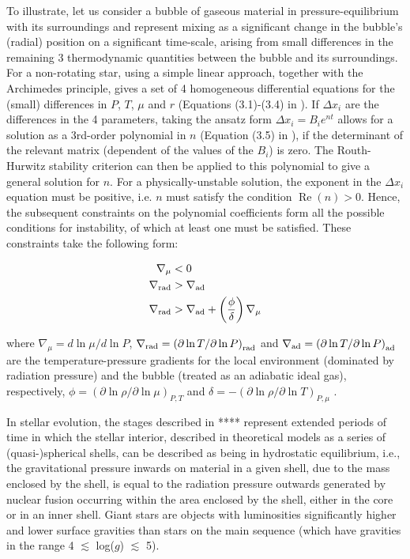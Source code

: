 \documentclass[12pt, a4paper]{report}
\begin{document}
To illustrate, let us consider a bubble of gaseous material in pressure-equilibrium with its surroundings and represent mixing as a significant change in the bubble's (radial) position on a significant time-scale, arising from small differences in the remaining 3 thermodynamic quantities between the bubble and its surroundings. For a non-rotating star, using a simple linear approach, together with the Archimedes principle, gives a set of 4 homogeneous differential equations for the (small) differences in $P$, $T$, $\mu$ and $r$ (Equations (3.1)-(3.4) in \cite{2017RSOS....470192S}). If $\Delta x_{i}$ are the differences in the 4 parameters, taking the ansatz form $\Delta x_{i} = B_{i} e^{nt}$ allows for a solution as a 3rd-order polynomial in $n$ (Equation (3.5) in \cite{2017RSOS....470192S}), if the determinant of the relevant matrix (dependent of the values of the $B_{i}$) is zero. The Routh-Hurwitz stability criterion can then be applied to this polynomial to give a general solution for $n$. For a physically-unstable solution, the exponent in the $\Delta x_{i}$ equation must be positive, i.e. $n$ must satisfy the condition $\operatorname{Re}(n) > 0$. Hence, the subsequent constraints on the polynomial coefficients form all the possible conditions for instability,  of which at least one must be satisfied. These constraints take the following form:

\begin{align}
\nabla _{\mu} &< 0 \label{mu_inv_ineq} \\
\nabla _{\textnormal{rad}} &> \nabla _{\textnormal{ad}} \label{schwarz_ineq} \\
\nabla _{\textnormal{rad}} &> \nabla _{\textnormal{ad}} + \left( \frac{\phi}{\delta} \right) \nabla _{\mu} \label{ledoux_ineq}
\end{align}

where $\nabla _{\mu} = d\ln\mu / d\ln P$, $\nabla _{\textnormal{rad}} = \left(\partial\ln T / \partial\ln P \right)_{\textnormal{rad}}$ and $\nabla _{\textnormal{ad}} = \left(\partial\ln T / \partial\ln P \right)_{\textnormal{ad}}$ are the temperature-pressure gradients for the local environment (dominated by radiation pressure) and the bubble (treated as an adiabatic ideal gas), respectively, $\phi = \left( \partial \ln\rho / \partial \ln\mu \right)_{P,T}$ and $\delta = -\left( \partial \ln\rho / \partial \ln T \right)_{P,\mu}$  \citep{1980A&A....91..175K}.

In stellar evolution, the stages described in **** represent extended periods of time in which the stellar interior, described in theoretical models as a series of (quasi-)spherical shells, can be described as being in hydrostatic equilibrium, i.e., the gravitational pressure inwards on material in a given shell, due to the mass enclosed by the shell, is equal to the radiation pressure outwards generated by nuclear fusion occurring within the area enclosed by the shell, either in the core or in an inner shell. Giant stars are objects with luminosities significantly higher and lower surface gravities than stars on the main sequence (which have gravities in the range 4 $\lesssim$ log($g$) $\lesssim$ 5).
\end{document}
